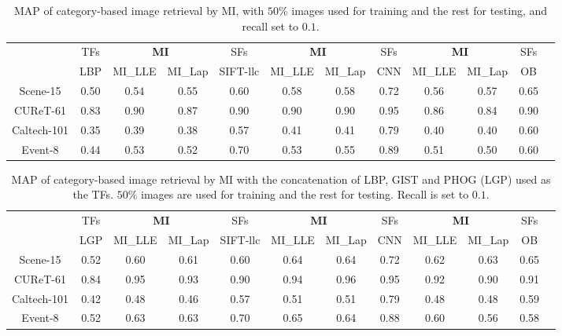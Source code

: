 \documentclass[10pt,twocolumn,letterpaper]{article}
\begin{document}
\begin{table}[!tb]
  \centering \small    \setlength{\tabcolsep}{.60em} 
  \caption{MAP of category-based image retrieval by MI, with $50\%$ images used for training and the rest for testing, and recall set to $0.1$.}
  \begin{tabular}{c|c|ccc|ccc|cccc}
   & TFs & \multicolumn{2}{c}{\textbf{MI}} & SFs & \multicolumn{2}{c}{ \textbf{MI} } & SFs & \multicolumn{2}{c}{ \textbf{MI}} & SFs  \\   
    & LBP & MI\_LLE & MI\_Lap & SIFT-llc  & MI\_LLE & MI\_Lap & CNN &  MI\_LLE & MI\_Lap & OB     \\   \hline  
   Scene-15  & 0.50  & 0.54  & 0.55  & 0.60   & 0.58  & 0.58  & 0.72   & 0.56  & 0.57  & 0.65 \\   
   CUReT-61  & 0.83  & 0.90  & 0.87  & 0.90  & 0.90  & 0.90  & 0.95 & 0.86  & 0.84  & 0.90 \\ 
   Caltech-101  & 0.35  & 0.39  & 0.38  & 0.57  & 0.41  & 0.41  & 0.79  & 0.40  & 0.40  & 0.60 \\  
   Event-8 & 0.44  & 0.53  & 0.52  & 0.70    & 0.53  & 0.55  & 0.89    & 0.51  & 0.50  & 0.60 \\   
  \end{tabular}
  \label{tab:class:retreval} 
\end{table}




 \begin{table}[!tb]
   \centering \small  \setlength{\tabcolsep}{.60em} 
\caption{MAP of category-based image retrieval by MI with the concatenation of LBP, GIST and PHOG (LGP) used as the TFs. 
    $50\%$ images are used for training and the rest for testing. Recall is set to $0.1$.}
  \begin{tabular}{c|c|ccc|ccc|cccc}
   & TFs & \multicolumn{2}{c}{\textbf{MI}} & SFs & \multicolumn{2}{c}{ \textbf{MI} } & SFs & \multicolumn{2}{c}{ \textbf{MI}} & SFs  \\   
    & LGP & MI\_LLE & MI\_Lap & SIFT-llc  & MI\_LLE & MI\_Lap & CNN &  MI\_LLE & MI\_Lap & OB     \\   \hline  
      Scene-15 & 0.52  & 0.60  & 0.61  & 0.60   & 0.64  & 0.64  & 0.72   & 0.62  & 0.63  & 0.65 \\ 
      CUReT-61 & 0.84  & 0.95  & 0.93  & 0.90    & 0.94  & 0.96  & 0.95    & 0.92  & 0.90  & 0.91 \\ 
      Caltech-101 & 0.42  & 0.48  & 0.46  & 0.57   & 0.51  & 0.51  & 0.79  & 0.48  & 0.48  & 0.59 \\ 
     Event-8 & 0.52  & 0.63  & 0.63  & 0.70  & 0.65  & 0.64  & 0.88   & 0.60  & 0.56  & 0.58 \\    
  \end{tabular}
     \label{tab:alltf}
 \end{table}
\end{document}
